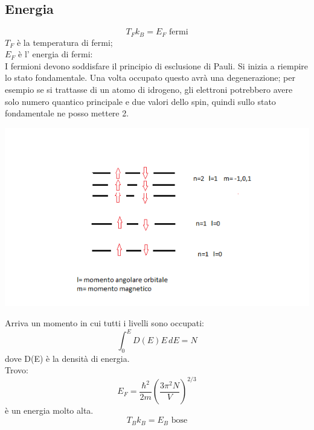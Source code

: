 \subsection{Energia}
\begin{equation}
T_{F}k_{B}=E_{F}  \textrm{   fermi}  
\end{equation}
$T_{F}$ è la temperatura di fermi;\\
$E_{F}$ è l' energia di fermi:\\
I fermioni devono soddisfare il principio di esclusione di Pauli. Si inizia a riempire lo stato fondamentale. Una volta occupato questo avrà una degenerazione; per esempio se si trattasse di un atomo di idrogeno, gli elettroni potrebbero avere solo numero quantico principale e due valori dello spin, quindi sullo stato fondamentale ne posso mettere 2.
\begin{center}
\includegraphics[scale=1]{immagini/occupazione-livelli.png}
\end{center}
Arriva un momento in cui tutti i livelli sono occupati:\\
\begin{equation}
\int_{0}^{E}D(E)E\,dE=N
\end{equation}
dove D(E) è la densità di energia.\\
Trovo:
\begin{equation}
E_{F}=\dfrac{\hbar^{2}}{2m}(\dfrac{3\pi^2N}{V})^{2/3}
\end{equation}
è un energia molto alta.
 \begin{equation}
T_{B}k_{B}=E_{B}  \textrm{  bose} 
\end{equation}

